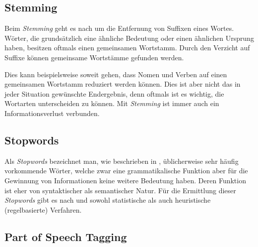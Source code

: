 
\subsection{Stemming}


Beim \textit{Stemming} geht es nach \cite{porter1980algorithm} um die Entfernung von Suffixen eines Wortes. Wörter, die grundsätzlich eine ähnliche Bedeutung oder einen ähnlichen Ursprung haben, besitzen oftmals einen gemeinsamen Wortstamm. Durch den Verzicht auf Suffixe können gemeinsame Wort\-stäm\-me gefunden werden.

Dies kann beispielsweise soweit gehen, dass Nomen und Verben auf einen gemeinsamen Wortstamm reduziert werden können. Dies ist aber nicht das in jeder Situation gewünschte Endergebnis, denn oftmals ist es wichtig, die Wortarten unterscheiden zu können. Mit \textit{Stemming} ist immer auch ein Informationsverlust verbunden. 


\subsection{Stopwords}


Als \textit{Stopwords} bezeichnet man, wie beschrieben in \cite{manning2008introduction}, üblicherweise sehr häufig vorkommende Wörter, welche zwar eine grammatikalische Funktion aber für die Gewinnung von Informationen keine weitere Bedeutung haben. Deren Funktion ist eher von syntaktischer als semantischer Natur. Für die Ermittlung dieser \textit{Stopwords} gibt es nach \cite{manning2008introduction} und \cite{wilbur1992automatic} sowohl statistische als auch heuristische (regelbasierte) Verfahren.


\subsection{Part of Speech Tagging}\label{part-of-speech}


